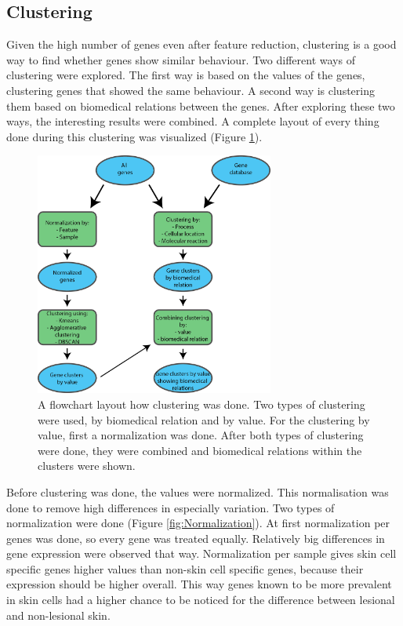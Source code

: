 \documentclass[10pt,a4paper]{article}
\begin{document}
	\subsection{Clustering}
	\label{subsec:MethodsPositionalClustering}
	
	Given the high number of genes even after feature reduction, clustering is a good way to find whether genes show similar behaviour. Two different ways of clustering were explored. The first way is based on the values of the genes, clustering genes that showed the same behaviour. A second way is clustering them based on biomedical relations between the genes. After exploring these two ways, the interesting results were combined. A complete layout of every thing done during this clustering was visualized (Figure \ref{fig:ClusteringLayout}).
	
		\begin{figure}[H]
		\includegraphics[width=0.7\textwidth]{ClusteringLayout.png}
		\caption{A flowchart layout how clustering was done. Two types of clustering were used, by biomedical relation and by value. For the clustering by value, first a normalization was done. After both types of clustering were done, they were combined and biomedical relations within the clusters were shown.}
		\label{fig:ClusteringLayout}
	\end{figure}
	
	Before clustering was done, the values were normalized. This normalisation was done to remove high differences in especially variation. Two types of normalization were done (Figure \ref{fig:Normalization}). At first normalization per genes was done, so every gene was treated equally. Relatively big differences in gene expression were observed that way. Normalization per sample gives skin cell specific genes higher values than non-skin cell specific genes, because their expression should be higher overall. This way genes known to be more prevalent in skin cells had a higher chance to be noticed for the difference between lesional and non-lesional skin.
	
\end{document}
